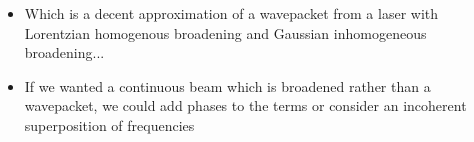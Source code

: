 \documentclass[english]{article}
\newcommand{\ket}[1]{|#1 \rangle}
\begin{document}
\begin{itemize}
\begin{align}
\ket{\psi_\mathrm{broad}}=\nonumber \\ \frac{1}{\mathcal{N}'}\int_{k'}dk' \frac{\gamma^2}{\gamma^2+(k'-k_0)^2} \exp\left(\int_kdk\exp\left[-\frac{(k-k')^2}{\sigma^2}\right](\alpha \hat{a}_k^\dagger-\alpha^\star \hat{a}_k)\right)\ket{0}
\end{align}
\item Which is a decent approximation of a wavepacket from a laser with Lorentzian homogenous broadening and Gaussian inhomogeneous broadening...  
\item If we wanted a continuous beam which is broadened rather than a wavepacket, we could add phases to the terms or consider an incoherent superposition of frequencies
\end{itemize}
\end{document}
